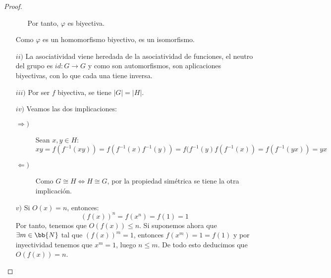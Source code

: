 \begin{prop}
\begin{proof}
\begin{enumerate}
\begin{itemize}
                        Por tanto, $\varphi$ es biyectiva.
                \end{itemize}
                Como $\varphi$ es un homomorfismo biyectivo, es un isomorfismo.
            \item[$ii)$] La asociatividad viene heredada de la asociatividad de funciones, el neutro del grupo es $id:G\to G$ y como son automorfismos, son aplicaciones biyectivas, con lo que cada una tiene inversa.
            \item[$iii)$] Por ser $f$ biyectiva, se tiene $|G| = |H|$.
            \item[$iv)$] Veamos las dos implicaciones:
                \begin{description}
                    \item [$\Longrightarrow)$] Sean $x,y\in H$:
                        \begin{equation*}
                            xy = f(f^{-1}(xy)) = f(f^{-1}(x)f^{-1}(y)) = f(f^{-1}(y) f(f^{-1}(x)) = f(f^{-1}(yx)) = yx
                        \end{equation*}
                    \item [$\Longleftarrow)$] Como $G\cong H \Longleftrightarrow H\cong G$, por la propiedad simétrica se tiene la otra implicación.
                \end{description}
            \item[$v)$] Si $O(x) = n$, entonces:
                \begin{equation*}
                    {(f(x))}^{n} = f(x^n) = f(1) = 1
                \end{equation*}
                Por tanto, tenemos que $O(f(x))\leq n$.
                Si suponemos ahora que $\exists m\in \bb{N}$ tal que ${(f(x))}^{m}=1$, entonces $f(x^m)= 1 = f(1)$ y por inyectividad tenemos que $x^m = 1$, luego $n\leq m$. De todo esto deducimos que $O(f(x)) = n$.


\end{enumerate}
\end{proof}
\end{prop}
